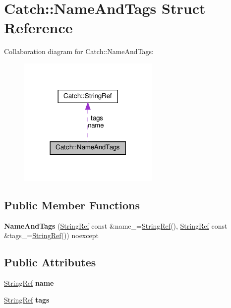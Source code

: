 \hypertarget{structCatch_1_1NameAndTags}{}\section{Catch\+::Name\+And\+Tags Struct Reference}
\label{structCatch_1_1NameAndTags}


Collaboration diagram for Catch\+::Name\+And\+Tags\+:\nopagebreak
\begin{figure}[H]
\begin{center}
\leavevmode
\includegraphics[width=194pt]{structCatch_1_1NameAndTags__coll__graph}
\end{center}
\end{figure}
\subsection*{Public Member Functions}
\begin{DoxyCompactItemize}
\item 
\mbox{\label{structCatch_1_1NameAndTags_ab585111e615ce8c504a2b9630de8ee94}} 
{\bfseries Name\+And\+Tags} (\mbox{\hyperlink{classCatch_1_1StringRef}{String\+Ref}} const \&name\+\_\+=\mbox{\hyperlink{classCatch_1_1StringRef}{String\+Ref}}(), \mbox{\hyperlink{classCatch_1_1StringRef}{String\+Ref}} const \&tags\+\_\+=\mbox{\hyperlink{classCatch_1_1StringRef}{String\+Ref}}()) noexcept
\end{DoxyCompactItemize}
\subsection*{Public Attributes}
\begin{DoxyCompactItemize}
\item 
\mbox{\label{structCatch_1_1NameAndTags_a7cbea60e0cebfa622c667008eb011420}} 
\mbox{\hyperlink{classCatch_1_1StringRef}{String\+Ref}} {\bfseries name}
\item 
\mbox{\label{structCatch_1_1NameAndTags_a74062ed1138834a348424eb7ed900c57}} 
\mbox{\hyperlink{classCatch_1_1StringRef}{String\+Ref}} {\bfseries tags}
\end{DoxyCompactItemize}


